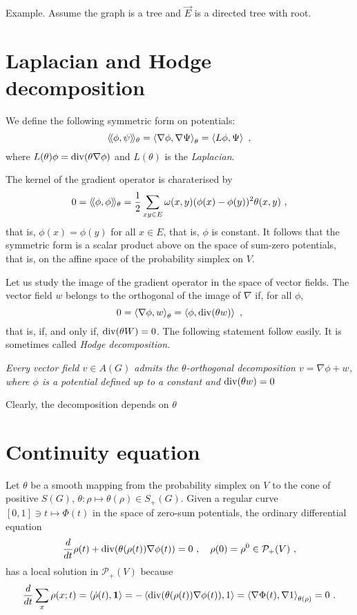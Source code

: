 \documentclass[12pt,a4paper]{amsart}
\begin{document}
Example. Assume the graph is a tree and $\overrightarrow E$ is a
directed tree with root.

\section{Laplacian and Hodge decomposition}
\label{sec:laplacian}

We define the following symmetric form on potentials:
\begin{equation*}
  \Scalarat \theta \phi \psi = \scalarat \theta {\nabla\phi}
  {\nabla\Psi} = \scalarof {L\phi} \Psi \ , 
\end{equation*}
where $L(\theta) \phi = \Div(\theta\nabla\phi)$ and $L(\theta)$ is the
\emph{Laplacian}.

The kernel of the gradient operator is charaterised by
\begin{equation*}
  0 = \Scalarat \theta \phi \phi = \frac 12 \sum_{xy \in E} \omega(x,y)
  (\phi(x) - \phi(y))^2 \theta(x,y) \ , 
\end{equation*}
that is, $\phi(x) = \phi(y)$ for all $x \in E$, that is, $\phi$ is
constant. It follows that the symmetric form is a scalar product above
on the space of sum-zero potentials, that is, on the affine space of
the probability simplex on $V$.

Let us study the image of the gradient operator in the space of vector
fields. The vector field $w$ belongs to the  orthogonal of the image of
$\nabla$ if, for all $\phi$,
\begin{equation*}
  0 = \scalarat \theta {\nabla \phi} w = \scalarof \phi {\Div(\theta
    w)} \ ,
\end{equation*}
that is, if, and only if, $\Div(\theta W) = 0$. The following
statement follow easily. It is sometimes called \emph{Hodge decomposition}.

\emph{Every vector field $v \in A(G)$ admits the $\theta$-orthogonal
  decomposition $v = \nabla \phi + w$, where $\phi$ is a potential
  defined up to a constant and $\Div(\theta w) = 0$}

Clearly, the decomposition depends on $\theta$

\section{Continuity equation}
\label{sec:continuity}

Let $\theta$ be a smooth mapping from the probability simplex on $V$ to the
cone of positive $S(G)$, $\theta \colon \rho \mapsto \theta(\rho) \in
S_+(G)$. Given a regular curve $[0,1] \ni t \mapsto \Phi(t)$ in the
space of zero-sum potentials, the ordinary differential equation
\begin{equation*}
  \derivby t \rho(t) +  \Div(\theta(\rho(t))\nabla \phi(t)) = 0 \ , \quad
  \rho(0) = \rho^0 \in \mathcal P_+(V) \ ,
\end{equation*}
has a local solution in $\mathcal P_+(V)$ because
\begin{equation*}
  \derivby t \sum_x \rho(x;t) = \scalarof {\dot \rho(t)}{\one} = 
 - \scalarof {\Div(\theta(\rho(t))\nabla \phi(t))}{1} = \scalarat
 {\theta(\rho)} {\nabla \Phi(t)}{\nabla 1}
 = 0 \ .
\end{equation*}
\end{document}
